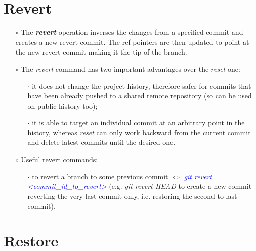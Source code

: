 \documentclass[a4paper,portrait,10pt]{article}   %
\newcommand{\mydiv}{$\Leftrightarrow$ }   %
\newcommand{\mycmd}[1]{\textcolor{blue}{\textit{#1}}}   %
\newcommand{\myvspace}{\vspace{4mm}}   %
\begin{document}

\section{Revert}   \label{sec:Revert}

\begin{itemize}
\item[$\circ$] The \textbf{\textit{revert}} operation inverses the changes from a specified commit and creates a new revert-commit. The ref pointers are then updated to point at the new revert commit making it the tip of the branch.
\myvspace

\item[$\circ$] The \textit{revert} command has two important advantages over the \textit{reset} one:
\begin{itemize}
  \item[$\cdot$] it does not change the project history, therefore safer for commits that have been already pushed to a shared remote repository (so can be used on public history too);
  \item[$\cdot$] it is able to target an individual commit at an arbitrary point in the history, whereas \textit{reset} can only work backward from the current commit and delete latest commits until the desired one.
\end{itemize}
\myvspace

\item[$\circ$] Useful revert commands:
\begin{itemize}
  \item[$\cdot$] to revert a branch to some previous commit \mydiv \mycmd{git revert <commit\_id\_to\_revert>} (e.g. \textit{git revert HEAD} to create a new commit reverting the very last commit only, i.e. restoring the second-to-last commit).
\end{itemize}
\end{itemize}
\myvspace


\section{Restore}   \label{sec:Restore}
\end{document}
